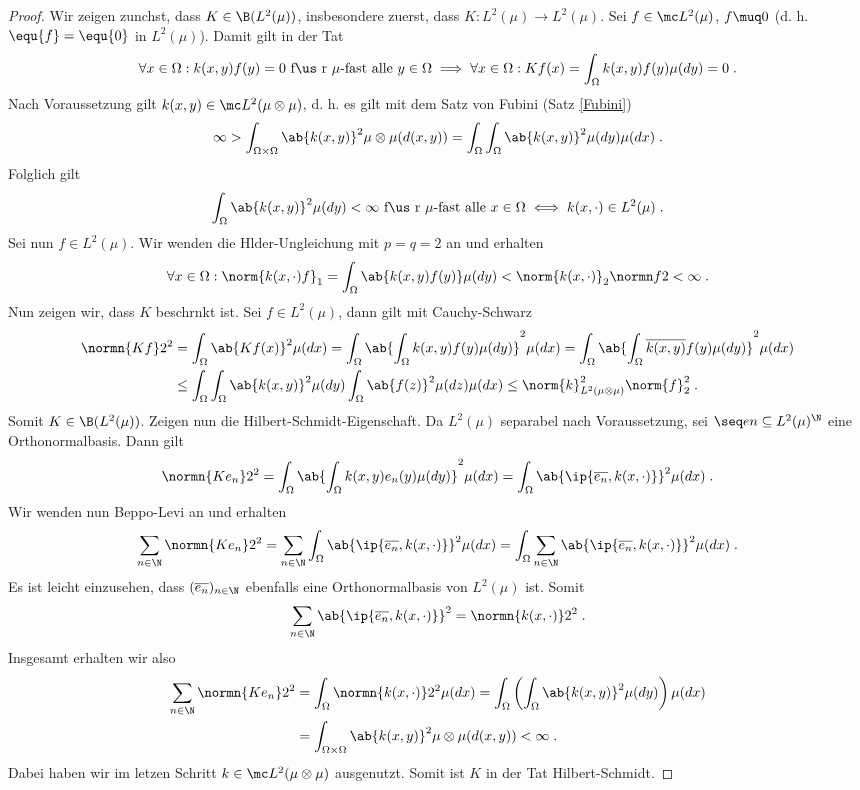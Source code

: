 \begin{proof}
	Wir zeigen zun\as chst, dass \(K\in \B(L^2(\mu))\), insbesondere zuerst, dass \(K: L^2(\mu) \to L^2(\mu)\). Sei \(f \in \mc L^2(\mu)\), \(f \muq 0\) (d. h. \(\equ{f} = \equ{0}\) in \(L^2(\mu)\)). Damit gilt in der Tat
	\[\forall x \in \Omega: k(x,y) f(y) = 0 \text{ f\us r $\mu$-fast alle }y\in \Omega \implies \forall x \in \Omega: Kf(x) = \int_\Omega k(x,y)f(y)\mu(dy) = 0\;.\]
	Nach Voraussetzung gilt \(k(x,y)\in \mc L^2(\mu\otimes \mu)\), d. h. es gilt mit dem Satz von Fubini (Satz \ref{Fubini})
	\[\infty >\int_{\Omega\times\Omega} \ab{k(x,y)}^2 \mu\otimes \mu(d(x,y)) = \int_\Omega \int_\Omega \ab{k(x,y)}^2\mu(dy)\mu(dx)\;.\]
	Folglich gilt 
	\[\int_\Omega \ab{k(x,y)}^2 \mu(dy) < \infty \text{ f\us r $\mu$-fast alle \(x\in\Omega\)} \iff k(x,\cdot) \in L^2(\mu)\;.\]
	Sei nun \(f\in L^2(\mu)\). Wir wenden die H\os lder-Ungleichung mit \(p = q = 2\) an und erhalten 
	\[\forall x\in \Omega: \norm{k(x,\cdot) f}_1 = \int_\Omega \ab{k(x,y) f(y)} \mu(dy)  < \norm{k(x,\cdot)}_2 \normn f2 < \infty\;.\]
	Nun zeigen wir, dass $K$ beschr\as nkt ist. Sei \(f\in L^2(\mu)\), dann gilt mit Cauchy-Schwarz
	\begin{align*}
		\normn{Kf}2^2 &= \int_\Omega \ab{Kf(x)}^2 \mu(dx) = \int_\Omega \ab{\int_\Omega k(x,y) f(y) \mu(dy)}^2\mu(dx) = \int_\Omega \ab{\int_\Omega \overline{k(x,y)} f(y) \mu(dy)}^2\mu(dx) \\& \leq \int_\Omega\int_\Omega \ab{k(x,y)}^2\mu(dy) \int_\Omega \ab{f(z)}^2 \mu(dz) \mu(dx) \leq \norm{k}^2_{L^2(\mu\otimes\mu)}\norm{f}_2^2\;.
	\end{align*}
	Somit \(K\in\B(L^2(\mu))\). Zeigen nun die Hilbert-Schmidt-Eigenschaft. Da \(L^2(\mu)\) separabel nach Voraussetzung, sei \(\seq en \subseteq L^2(\mu)^\N\) eine Orthonormalbasis. Dann gilt
	\[\normn{Ke_n}2^2 = \int_\Omega\ab{\int_\Omega k(x,y) e_n(y) \mu(dy)}^2 \mu(dx) = \int_\Omega\ab{\ip{\overline{e_n}, k(x,\cdot)}}^2 \mu(dx)\;.\]
	Wir wenden nun Beppo-Levi an und erhalten
	\[\sum_{n\in\N} \normn{Ke_n}2^2 = \sum_{n\in\N} \int_\Omega\ab{\ip{\overline{e_n}, k(x,\cdot)}}^2 \mu(dx) = \int_\Omega\sum_{n\in\N}\ab{\ip{\overline{e_n}, k(x,\cdot)}}^2\mu(dx)\;.\]
	Es ist leicht einzusehen, dass \((\overline{e_n})_{n\in\N}\) ebenfalls eine Orthonormalbasis von \(L^2(\mu)\) ist. Somit 
	\[\sum_{n\in\N}\ab{\ip{\overline{e_n}, k(x,\cdot)}}^2 = \normn{k(x,\cdot)}2^2\;.\]
	Insgesamt erhalten wir also 
	\begin{align*}
	\sum_{n\in\N} \normn{Ke_n}2^2  &= \int_\Omega \normn{k(x,\cdot)}2^2 \mu(dx) = \int_\Omega\left(\int_\Omega \ab{k(x,y)}^2 \mu(dy)\right)\mu(dx) \\
	&= \int_{\Omega \times \Omega}\ab{k(x,y)}^2 \mu\otimes\mu(d(x,y))<\infty\;.
	\end{align*}
	Dabei haben wir im letzen Schritt \(k\in \mc L^2(\mu\otimes \mu)\) ausgenutzt. Somit ist $K$ in der Tat Hilbert-Schmidt.
\end{proof}